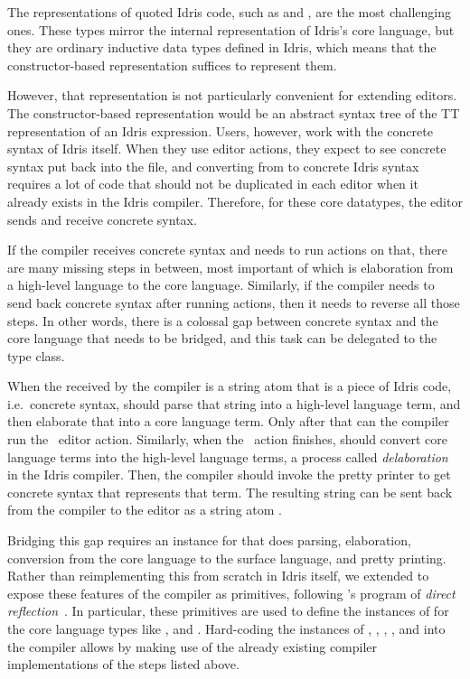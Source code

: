 The \sexp{} representations of quoted Idris code, such as \TT{}  and
\TyDecl{}, are the most challenging ones. These types mirror the internal
representation of Idris's core language, but they are ordinary inductive data
types defined in Idris, which means that the constructor-based representation
suffices to represent them.

However, that representation is not particularly convenient for
extending editors.  The constructor-based representation would be an
abstract syntax tree of the \textsf{TT} representation of an Idris
expression. Users, however, work with the concrete syntax of Idris
itself. When they use editor actions, they expect to see concrete
syntax put back into the file, and converting from \TT{} to concrete
Idris syntax requires a lot of code that should not be duplicated in
each editor when it already exists in the Idris compiler. Therefore,
for these core datatypes, the editor sends and receive concrete
syntax.

If the compiler receives concrete syntax and needs to run \Elab{}
actions on that, there are many missing steps in between, most important of
which is elaboration from a high-level language to the core language.
Similarly, if the compiler needs to send back concrete syntax after
running \Elab{} actions, then it needs to reverse all those steps.
In other words, there is a colossal gap between concrete syntax and the core
language that needs to be bridged, and this task can be delegated to the
\Editorable{} type class.

When the \sexp{} received by the compiler is a string atom that is a
piece of Idris code, i.e.\ concrete syntax,  should parse that
string into a high-level language term, and then elaborate that into a core
language term. Only after that can the compiler run the \Elab\ editor action.
Similarly, when the \Elab\ action finishes,  should convert core
language terms into the high-level language terms, a process called
\emph{delaboration} in the Idris compiler.
Then, the compiler should invoke the pretty printer to get concrete syntax that
represents that term. The resulting string can be sent back from the compiler
to the editor as a string atom \sexp{}.

Bridging this gap requires an \Editorable{} instance for \TT{} that does parsing,
elaboration, conversion from the core language to the surface language, and pretty printing.
Rather than reimplementing this from scratch in Idris itself, we extended \Elab{}
to expose these features of the compiler as primitives, following \citeauthor{barzilayphd}'s program of \emph{direct reflection}~\citep{barzilayphd}.
In particular, these primitives are used to define the instances of \Editorable{}
for the core language types like \TT{}, \TyDecl{} and \FunDefn{}.
Hard-coding the \Editorable{} instances of , ,
, , and  into the compiler
allows  by making use
of the already existing compiler implementations of the steps listed above.

